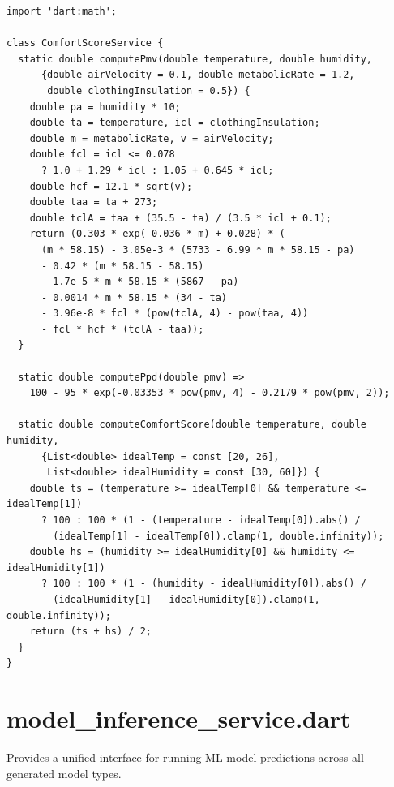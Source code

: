 \documentclass[12pt,a4paper,oneside]{report}
\begin{document}
\begin{lstlisting}[style=dartstyle]
import 'dart:math';

class ComfortScoreService {
  static double computePmv(double temperature, double humidity,
      {double airVelocity = 0.1, double metabolicRate = 1.2,
       double clothingInsulation = 0.5}) {
    double pa = humidity * 10;
    double ta = temperature, icl = clothingInsulation;
    double m = metabolicRate, v = airVelocity;
    double fcl = icl <= 0.078
      ? 1.0 + 1.29 * icl : 1.05 + 0.645 * icl;
    double hcf = 12.1 * sqrt(v);
    double taa = ta + 273;
    double tclA = taa + (35.5 - ta) / (3.5 * icl + 0.1);
    return (0.303 * exp(-0.036 * m) + 0.028) * (
      (m * 58.15) - 3.05e-3 * (5733 - 6.99 * m * 58.15 - pa)
      - 0.42 * (m * 58.15 - 58.15)
      - 1.7e-5 * m * 58.15 * (5867 - pa)
      - 0.0014 * m * 58.15 * (34 - ta)
      - 3.96e-8 * fcl * (pow(tclA, 4) - pow(taa, 4))
      - fcl * hcf * (tclA - taa));
  }

  static double computePpd(double pmv) =>
    100 - 95 * exp(-0.03353 * pow(pmv, 4) - 0.2179 * pow(pmv, 2));

  static double computeComfortScore(double temperature, double humidity,
      {List<double> idealTemp = const [20, 26],
       List<double> idealHumidity = const [30, 60]}) {
    double ts = (temperature >= idealTemp[0] && temperature <= idealTemp[1])
      ? 100 : 100 * (1 - (temperature - idealTemp[0]).abs() /
        (idealTemp[1] - idealTemp[0]).clamp(1, double.infinity));
    double hs = (humidity >= idealHumidity[0] && humidity <= idealHumidity[1])
      ? 100 : 100 * (1 - (humidity - idealHumidity[0]).abs() /
        (idealHumidity[1] - idealHumidity[0]).clamp(1, double.infinity));
    return (ts + hs) / 2;
  }
}
\end{lstlisting}

\section{model\_inference\_service.dart}

Provides a unified interface for running ML model predictions across all generated model types.
\end{document}
